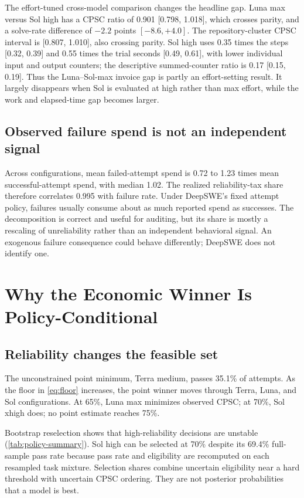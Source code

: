 \documentclass[11pt]{article}
\begin{document}
The effort-tuned cross-model comparison changes the headline gap. Luna max versus Sol high has a
CPSC ratio of 0.901 [0.798, 1.018], which crosses parity, and a solve-rate difference of $-2.2$
points $[-8.6,+4.0]$. The repository-cluster CPSC interval is [0.807, 1.010], also crossing parity.
Sol high uses 0.35 times the steps [0.32, 0.39] and 0.55 times the trial seconds [0.49, 0.61], with
lower individual input and output counters; the descriptive summed-counter ratio is 0.17
[0.15, 0.19]. Thus the Luna--Sol-max invoice gap is partly an effort-setting result. It largely
disappears when Sol is evaluated at high rather than max effort, while the work and elapsed-time gap
becomes larger.

\subsection{Observed failure spend is not an independent signal}

Across configurations, mean failed-attempt spend is 0.72 to 1.23 times mean successful-attempt
spend, with median 1.02. The realized reliability-tax share therefore correlates 0.995 with failure
rate. Under DeepSWE's fixed attempt policy, failures usually consume about as much reported spend
as successes. The decomposition is correct and useful for auditing, but its share is mostly a
rescaling of unreliability rather than an independent behavioral signal. An exogenous failure
consequence could behave differently; DeepSWE does not identify one.

\section{Why the Economic Winner Is Policy-Conditional}

\subsection{Reliability changes the feasible set}

The unconstrained point minimum, Terra medium, passes 35.1\% of attempts. As the floor in
\cref{eq:floor} increases, the point winner moves through Terra, Luna, and Sol configurations. At
65\%, Luna max minimizes observed CPSC; at 70\%, Sol xhigh does; no point estimate reaches 75\%.

Bootstrap reselection shows that high-reliability decisions are unstable
(\cref{tab:policy-summary}). Sol high can be selected at 70\% despite its 69.4\% full-sample pass
rate because pass rate and eligibility are recomputed on each resampled task mixture. Selection
shares combine uncertain eligibility near a hard threshold with uncertain CPSC ordering. They are
not posterior probabilities that a model is best.
\end{document}
